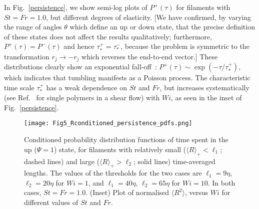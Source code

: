 \documentclass[aps,prl,twocolumn,superscriptaddress,floatfix,tightenlines,showpacs,notitlepage]{revtex4-1}
\begin{document}
In Fig.~\ref{persistence}, we show semi-log plots of $P^+(\tau)$
for filaments with $St=Fr = 1.0$, but different degrees of elasticity.
[We have confirmed, by varying the range of angles $\theta$ which define an up
or down state, that the precise definition of these states does not affect the results qualitatively;
furthermore, $P^+(\tau) = P^-(\tau)$ and hence
$\tau^+_* = \tau^-_*$, because the problem is symmetric to the transformation 
$r_j \rightarrow -r_j$ which reverses the end-to-end vector.] 
These distributions clearly show an exponential fall-off~\cite{Celani_2005}: $P^+(\tau) \sim \exp(-\tau/\tau^+_*)$,
which indicates that tumbling manifests as a Poisson process. The characteristic time scale 
$\tau^+_*$ has a weak dependence on $St$ and $Fr$, but increases systematically (see Ref.~\cite{Celani_2005} for single 
polymers in a shear flow) with $Wi$, as seen in the inset of Fig.~\ref{persistence}. 


\begin{figure}
\texttt{[image: Fig5\_Rconditioned\_persistence\_pdfs.png]}
	\caption{Conditioned probability distribution functions of time spent in the up ($\Psi = 1$) state, for filaments with relatively small ($\langle R \rangle_+ < \ell_1$; dashed lines) and large ($\langle R \rangle_+ > \ell_2$; solid lines) time-averaged lengths. The values of the thresholds for the two cases are $\ell_1 = 9\eta$, $\ell_2 = 20\eta$ for $Wi = 1$, and $\ell_1 = 40\eta$, $\ell_2 = 65\eta$ for $Wi = 10$. In both cases, $St = Fr = 1.0$.  (Inset) Plot of normalised $\langle { R^2}\rangle $, versus $Wi$ for different values of $St$ and $Fr$.}
\label{conditioned_pdfs}
\end{figure}
\end{document}
